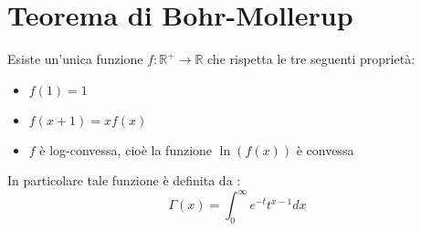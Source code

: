 \section{Teorema di Bohr-Mollerup}

\begin{theorem}
\label{BohrMollerup}
Esiste un'unica funzione $f :\mathbb{R}^{+}\rightarrow\mathbb{R} $ che rispetta le tre seguenti proprietà:
\begin{itemize}
 \item $f(1)=1$
 \item $f(x+1)=xf(x)$
 \item $f$ è log-convessa, cioè la funzione $\ln(f(x))$ è convessa
\end{itemize}
In particolare tale funzione è definita da :
\begin{equation}
 \label{GammaDefinition}
 \Gamma(x)=\int_0^{\infty}{e^{-t}t^{x-1}dx}
\end{equation}
\end{theorem}

